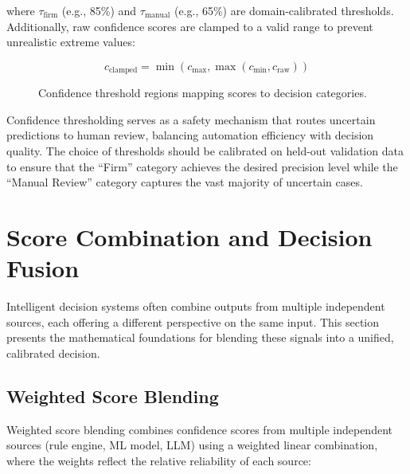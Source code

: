 \documentclass[10pt,a4paper]{article}
\begin{document}
where $\tau_{\text{firm}}$ (e.g., 85\%) and $\tau_{\text{manual}}$ (e.g., 65\%) are domain-calibrated thresholds. Additionally, raw confidence scores are clamped to a valid range to prevent unrealistic extreme values:

\begin{equation}
c_{\text{clamped}} = \min(c_{\max}, \max(c_{\min}, c_{\text{raw}}))
\label{eq:clamping}
\end{equation}

\begin{figure}[H]
    \centering
    \caption{Confidence threshold regions mapping scores to decision categories.}
    \label{fig:confidence-thresholds}
\end{figure}

Confidence thresholding serves as a safety mechanism that routes uncertain predictions to human review, balancing automation efficiency with decision quality. The choice of thresholds should be calibrated on held-out validation data to ensure that the ``Firm'' category achieves the desired precision level while the ``Manual Review'' category captures the vast majority of uncertain cases.

\section{Score Combination and Decision Fusion}
\label{sec:score-combination}

Intelligent decision systems often combine outputs from multiple independent sources, each offering a different perspective on the same input. This section presents the mathematical foundations for blending these signals into a unified, calibrated decision.

\subsection{Weighted Score Blending}
\label{sec:weighted-blending}

Weighted score blending combines confidence scores from multiple independent sources (rule engine, ML model, LLM) using a weighted linear combination, where the weights reflect the relative reliability of each source:
\end{document}

